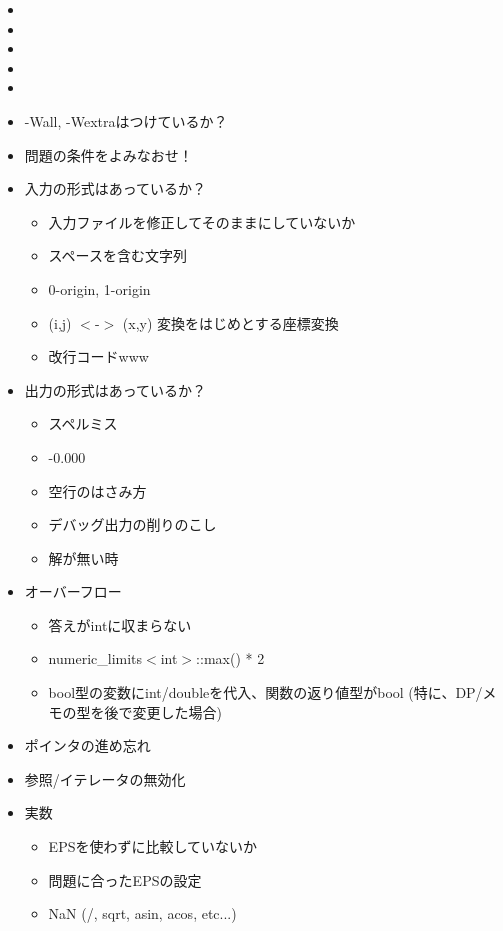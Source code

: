 \begin{itemize}
\item{}
\item{}
\item{}
\item{}
\item{}
\item{-Wall, -Wextraはつけているか？}
\item{問題の条件をよみなおせ！}
\item{入力の形式はあっているか？}
\begin{itemize}
\item{入力ファイルを修正してそのままにしていないか}
\item{スペースを含む文字列}
\item{0-origin, 1-origin}
\item{(i,j) $<$-$>$ (x,y) 変換をはじめとする座標変換}
\item{改行コードwww}
\end{itemize}
\item{出力の形式はあっているか？}
\begin{itemize}
\item{スペルミス}
\item{-0.000}
\item{空行のはさみ方}
\item{デバッグ出力の削りのこし}
\item{解が無い時}
\end{itemize}
\item{オーバーフロー}
\begin{itemize}
\item{答えがintに収まらない}
\item{numeric\_limits$<$int$>$::max() * 2}
\item{bool型の変数にint/doubleを代入、関数の返り値型がbool (特に、DP/メモの型を後で変更した場合)}
\end{itemize}
\item{ポインタの進め忘れ}
\item{参照/イテレータの無効化}
\item{実数}
\begin{itemize}
\item{EPSを使わずに比較していないか}
\item{問題に合ったEPSの設定}
\item{NaN (/, sqrt, asin, acos, etc...)}
\end{itemize}

\end{itemize}
